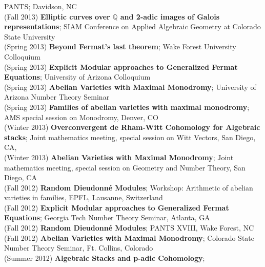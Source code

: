 \documentclass[margin,line]{res}
\begin{document}
\begin{resume}
PANTS; Davidson, NC
\vspace{.05cm}\\
(Fall 2013) \textbf{Elliptic curves over $\mathbb{Q}$ and 2-adic images of Galois representations};  
SIAM Conference on Applied Algebraic Geometry at Colorado State University 
\vspace{.05cm}\\
(Spring 2013) \textbf{Beyond Fermat's last theorem};
Wake Forest University Colloquium
\vspace{.05cm}\\
(Spring 2013) \textbf{Explicit Modular approaches to Generalized Fermat Equations};
University of Arizona Colloquium
\vspace{.05cm}\\
(Spring 2013) \textbf{Abelian Varieties with Maximal Monodromy};
University of Arizona Number Theory Seminar 
\vspace{.05cm}\\
(Spring 2013) \textbf{Families of abelian varieties with maximal monodromy};
AMS special session on Monodromy, 
Denver, CO
\vspace{.05cm}\\
(Winter 2013) \textbf{Overconvergent de Rham-Witt Cohomology for Algebraic stacks};
Joint mathematics meeting, special session on Witt Vectors, San Diego, CA, 
\vspace{.05cm}\\
(Winter 2013) \textbf{Abelian Varieties with Maximal Monodromy};
Joint mathematics meeting, special session on Geometry and Number Theory, San Diego, CA
\vspace{.05cm}\\
(Fall 2012) \textbf{Random Dieudonn\'e Modules};
Workshop: Arithmetic of abelian varieties in families, EPFL, Lausanne, Switzerland 
\vspace{.05cm}\\
(Fall 2012) \textbf{Explicit Modular approaches to Generalized Fermat Equations};
Georgia Tech Number Theory Seminar, Atlanta, GA 
\vspace{.05cm}\\
(Fall 2012) \textbf{Random Dieudonn\'e Modules};
PANTS XVIII, Wake Forest, NC 
\vspace{.05cm}\\
(Fall 2012) \textbf{Abelian Varieties with Maximal Monodromy};
Colorado State Number Theory Seminar, Ft. Collins, Colorado 
\vspace{.05cm}\\
(Summer 2012) \textbf{Algebraic Stacks and p-adic Cohomology};

\end{resume}
\end{document}
